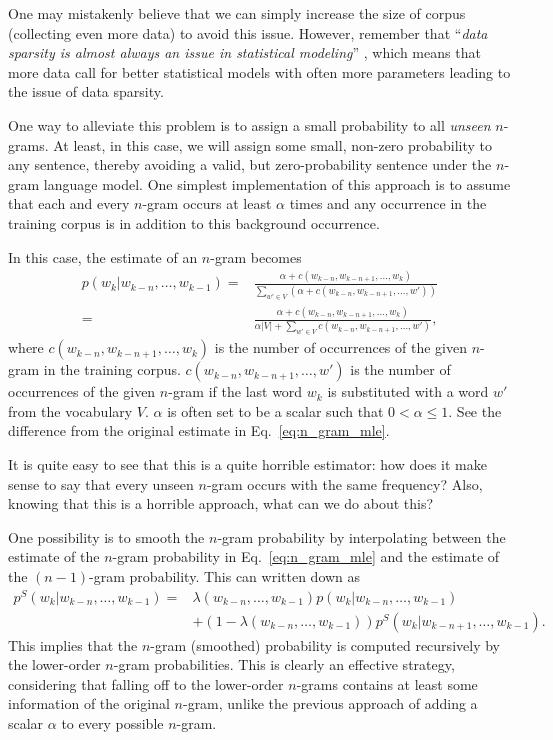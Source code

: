 \documentclass{report}
\begin{document}
One may mistakenly believe that we can simply increase the size of corpus
(collecting even more data) to avoid this issue. However, remember that
``\emph{data sparsity is almost always an issue in statistical modeling}''
\citep{chen1996empirical}, which means that more data call for better statistical
models with often more parameters leading to the issue of data sparsity.

One way to alleviate this problem is to assign a small probability to all {\em
unseen} $n$-grams. At least, in this case, we will assign some small, non-zero
probability to any sentence, thereby avoiding a valid, but zero-probability
sentence under the $n$-gram language model. One simplest implementation of this
approach is to assume that each and every $n$-gram occurs at least $\alpha$
times and any occurrence in the training corpus is in addition to this
background occurrence. 

In this case, the estimate of an $n$-gram becomes
\begin{align*}
    p(w_k | w_{k-n}, \ldots, w_{k-1}) =&
    \frac{\alpha + c(w_{k-n}, w_{k-n+1}, \ldots, w_k)}{\sum_{w' \in V} (\alpha
    + c(w_{k-n}, w_{k-n+1}, \ldots, w'))} 
    \\
    =&
    \frac{\alpha + c(w_{k-n}, w_{k-n+1}, \ldots, w_k)}{\alpha |V| + \sum_{w' \in V}
    c(w_{k-n}, w_{k-n+1}, \ldots, w')},
\end{align*}
where $c(w_{k-n}, w_{k-n+1}, \ldots, w_k)$ is the number of occurrences of the
given $n$-gram in the training corpus. $c(w_{k-n}, w_{k-n+1}, \ldots, w')$ is
the number of occurrences of the given $n$-gram if the last word $w_k$ is
substituted with a word $w'$ from the vocabulary $V$. $\alpha$ is often set to
be a scalar such that $0 < \alpha \leq 1$. See the difference from the original
estimate in Eq.~\eqref{eq:n_gram_mle}.

It is quite easy to see that this is a quite horrible estimator: how does it
make sense to say that every unseen $n$-gram occurs with the same frequency?
Also, knowing that this is a horrible approach, what can we do about this?

One possibility is to smooth the $n$-gram probability by interpolating between
the estimate of the $n$-gram probability in Eq.~\eqref{eq:n_gram_mle} and the
estimate of the $(n-1)$-gram probability. This can written down as
\begin{align}
    p^S(w_k | w_{k-n}, \ldots, w_{k-1}) = &
    \lambda(w_{k-n}, \ldots, w_{k-1}) p(w_k | w_{k-n}, \ldots, w_{k-1}) 
    \nonumber \\
    \label{eq:n_gram_smooth}
    & + (1 - \lambda(w_{k-n}, \ldots, w_{k-1})) p^S(w_k | w_{k-n+1}, \ldots,
    w_{k-1}).
\end{align}
This implies that the $n$-gram (smoothed) probability is computed recursively by
the lower-order $n$-gram probabilities. This is clearly an effective strategy,
considering that falling off to the lower-order $n$-grams contains at least some
information of the original $n$-gram, unlike the previous approach of adding a
scalar $\alpha$ to every possible $n$-gram.
\end{document}
